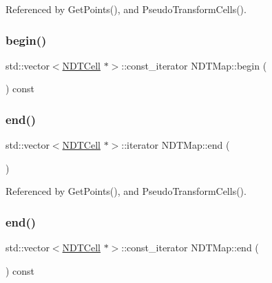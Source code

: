 Referenced by Get\+Points(), and Pseudo\+Transform\+Cells().

\mbox{\label{classNDTMap_ad35b977c2c8e568da37787a529ae6df5}} 
\subsubsection{\texorpdfstring{begin()}{begin()}\hspace{0.1cm}{\footnotesize\ttfamily [2/2]}}
{\footnotesize\ttfamily std\+::vector$<$\hyperlink{classNDTCell}{N\+D\+T\+Cell} $\ast$$>$\+::const\+\_\+iterator N\+D\+T\+Map\+::begin (\begin{DoxyParamCaption}{ }\end{DoxyParamCaption}) const\hspace{0.3cm}{\ttfamily [inline]}}

\mbox{\label{classNDTMap_a10cc94926e3fc5ac31fa50f166eb3025}} 
\subsubsection{\texorpdfstring{end()}{end()}\hspace{0.1cm}{\footnotesize\ttfamily [1/2]}}
{\footnotesize\ttfamily std\+::vector$<$\hyperlink{classNDTCell}{N\+D\+T\+Cell} $\ast$$>$\+::iterator N\+D\+T\+Map\+::end (\begin{DoxyParamCaption}{ }\end{DoxyParamCaption})\hspace{0.3cm}{\ttfamily [inline]}}



Referenced by Get\+Points(), and Pseudo\+Transform\+Cells().

\mbox{\label{classNDTMap_a248b578e22a0e8a0b3211df280fbe0a5}} 
\subsubsection{\texorpdfstring{end()}{end()}\hspace{0.1cm}{\footnotesize\ttfamily [2/2]}}
{\footnotesize\ttfamily std\+::vector$<$\hyperlink{classNDTCell}{N\+D\+T\+Cell} $\ast$$>$\+::const\+\_\+iterator N\+D\+T\+Map\+::end (\begin{DoxyParamCaption}{ }\end{DoxyParamCaption}) const\hspace{0.3cm}{\ttfamily [inline]}}

